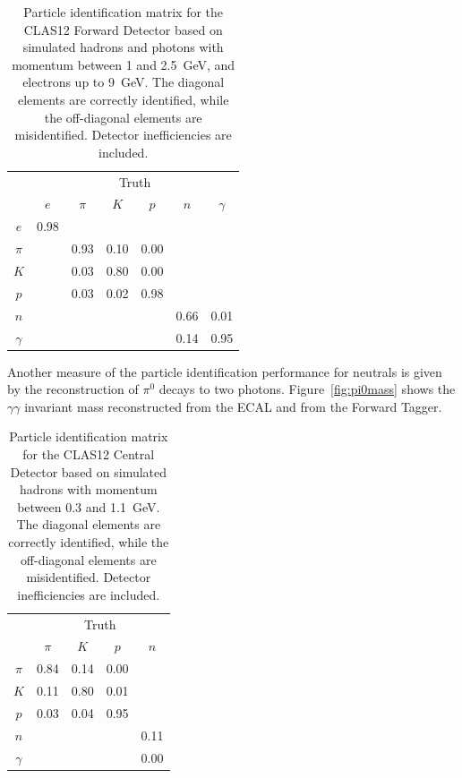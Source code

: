 \begin{table}[ht]
  \begin{center}
    \begin{tabular}{|c|cccccc|}\hline
          & \multicolumn{6}{c|}{Truth}\\        
          & $e$  & $\pi$ & $K$  & $p$  & $n$  & $\gamma$ \\\hline
  $e$     & 0.98 &       &      &      &      &          \\ 
  $\pi$   &      &  0.93 & 0.10 & 0.00 &      &          \\ 
  $K$     &      &  0.03 & 0.80 & 0.00 &      &          \\ 
  $p$     &      &  0.03 & 0.02 & 0.98 &      &          \\ 
  $n$     &      &       &      &      & 0.66 &   0.01   \\ 
 $\gamma$ &      &       &      &      & 0.14 &   0.95   \\\hline 
    \end{tabular}  
    \caption{Particle identification matrix for the CLAS12 Forward Detector based on simulated hadrons and
      photons with momentum between 1 and 2.5~GeV, and electrons up to 9~GeV. The diagonal elements are
      correctly identified, while the off-diagonal elements are misidentified. Detector inefficiencies are included.}
  \label{table:pidmatrix}
  \end{center}
\end{table}

Another measure of the particle identification performance for neutrals is given by the reconstruction of $\pi^0$
decays to two photons. Figure~\ref{fig:pi0mass} shows the $\gamma \gamma$ invariant mass reconstructed from
the ECAL and from the Forward Tagger.

\begin{table}[ht]
  \begin{center}
    \begin{tabular}{|c|cccc|}\hline
          & \multicolumn{4}{c|}{Truth}\\        
          & $\pi$ & $K$  & $p$  & $n$  \\\hline
  $\pi$   &  0.84 & 0.14 & 0.00 &      \\ 
  $K$     &  0.11 & 0.80 & 0.01 &      \\ 
  $p$     &  0.03 & 0.04 & 0.95 &      \\ 
  $n$     &       &      &      & 0.11 \\ 
 $\gamma$ &       &      &      & 0.00 \\\hline 
    \end{tabular}  
    \caption{Particle identification matrix for the CLAS12 Central Detector based on simulated hadrons with momentum
      between 0.3 and 1.1~GeV. The diagonal elements are correctly identified, while the off-diagonal elements
      are misidentified. Detector inefficiencies are included.}
  \label{table:pidmatrix2}
  \end{center}
\end{table}

